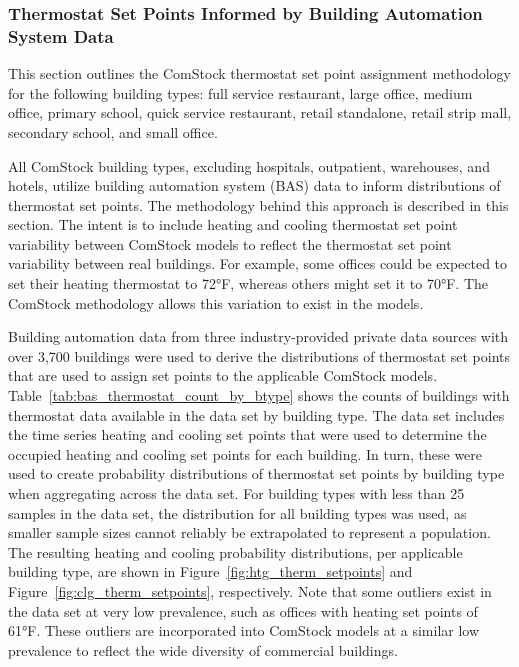 \subsubsection{Thermostat Set Points Informed by Building Automation System Data}
\label{section:therm_setpoints_bas}

This section outlines the ComStock thermostat set point assignment methodology for the following building types: full service restaurant, large office, medium office, primary school, quick service restaurant, retail standalone, retail strip mall, secondary school, and small office.

All ComStock building types, excluding hospitals, outpatient, warehouses, and hotels, utilize building automation system (BAS) data to inform distributions of thermostat set points. The methodology behind this approach is described in this section. The intent is to include heating and cooling thermostat set point variability between ComStock models to reflect the thermostat set point variability between real buildings. For example, some offices could be expected to set their heating thermostat to 72°F, whereas others might set it to 70°F. The ComStock methodology allows this variation to exist in the models.

Building automation data from three industry-provided private data sources with over 3,700 buildings were used to derive the distributions of thermostat set points that are used to assign set points to the applicable ComStock models. Table~\ref{tab:bas_thermostat_count_by_btype} shows the counts of buildings with thermostat data available in the data set by building type. The data set includes the time series heating and cooling set points that were used to determine the occupied heating and cooling set points for each building. In turn, these were used to create probability distributions of thermostat set points by building type when aggregating across the data set. For building types with less than 25 samples in the data set, the distribution for all building types was used, as smaller sample sizes cannot reliably be extrapolated to represent a population. The resulting heating and cooling probability distributions, per applicable building type, are shown in Figure~\ref{fig:htg_therm_setpoints} and Figure~\ref{fig:clg_therm_setpoints}, respectively. Note that some outliers exist in the data set at very low prevalence, such as offices with heating set points of 61°F. These outliers are incorporated into ComStock models at a similar low prevalence to reflect the wide diversity of commercial buildings.

